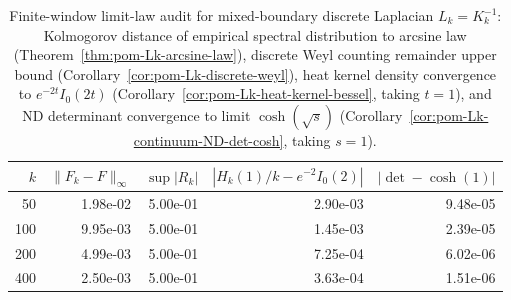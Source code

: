 \begin{table}[H]
\centering
\scriptsize
\setlength{\tabcolsep}{6pt}
\caption{Finite-window limit-law audit for mixed-boundary discrete Laplacian $L_k=K_k^{-1}$: Kolmogorov distance of empirical spectral distribution to arcsine law (Theorem~\ref{thm:pom-Lk-arcsine-law}), discrete Weyl counting remainder upper bound (Corollary~\ref{cor:pom-Lk-discrete-weyl}), heat kernel density convergence to $e^{-2t}I_0(2t)$ (Corollary~\ref{cor:pom-Lk-heat-kernel-bessel}, taking $t=1$), and ND determinant convergence to limit $\cosh(\sqrt{s})$ (Corollary~\ref{cor:pom-Lk-continuum-ND-det-cosh}, taking $s=1$).}
\label{tab:fence_green_kernel_spectral_limit_laws_audit}
\begin{tabular}{r r r r r}
\toprule
$k$ & $\|F_k-F\|_{\infty}$ & $\sup|R_k|$ & $|H_k(1)/k- e^{-2}I_0(2)|$ & $|\det-\cosh(1)|$\\
\midrule
50 & 1.98e-02 & 5.00e-01 & 2.90e-03 & 9.48e-05\\
100 & 9.95e-03 & 5.00e-01 & 1.45e-03 & 2.39e-05\\
200 & 4.99e-03 & 5.00e-01 & 7.25e-04 & 6.02e-06\\
400 & 2.50e-03 & 5.00e-01 & 3.63e-04 & 1.51e-06\\
\bottomrule
\end{tabular}
\end{table}
